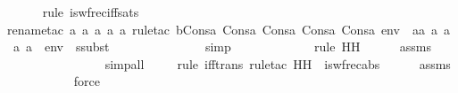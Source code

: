 \begin{isabellebody}
\ \ \ \ \ \isamarkupfalse%
{\isacharparenleft}{\kern0pt}rule\ is{\isacharunderscore}{\kern0pt}wfrec{\isacharunderscore}{\kern0pt}iff{\isacharunderscore}{\kern0pt}sats{\isacharparenright}{\kern0pt}\isanewline
\ \ \ \ \ \ \ \ \ \ \ \ \isamarkupfalse%
{\isacharparenleft}{\kern0pt}rename{\isacharunderscore}{\kern0pt}tac\ a{}\ a{}\ a{}\ a{}\ a{}{\isacharcomma}{\kern0pt}\ rule{\isacharunderscore}{\kern0pt}tac\ b{\isacharequal}{\kern0pt}{\isachardoublequoteopen}Cons{\isacharparenleft}{\kern0pt}a{}{\isacharcomma}{\kern0pt}\ Cons{\isacharparenleft}{\kern0pt}a{}{\isacharcomma}{\kern0pt}\ Cons{\isacharparenleft}{\kern0pt}a{}{\isacharcomma}{\kern0pt}\ Cons{\isacharparenleft}{\kern0pt}a{}{\isacharcomma}{\kern0pt}\ Cons{\isacharparenleft}{\kern0pt}a{}{\isacharcomma}{\kern0pt}\ env{\isacharparenright}{\kern0pt}{\isacharparenright}{\kern0pt}{\isacharparenright}{\kern0pt}{\isacharparenright}{\kern0pt}{\isacharparenright}{\kern0pt}{\isachardoublequoteclose}\ \ a{\isacharequal}{\kern0pt}{\isachardoublequoteopen}{\isacharbrackleft}{\kern0pt}a{}{\isacharcomma}{\kern0pt}\ a{}{\isacharcomma}{\kern0pt}\ a{}{\isacharbrackright}{\kern0pt}\ {\isacharat}{\kern0pt}\ {\isacharparenleft}{\kern0pt}{\isacharbrackleft}{\kern0pt}a{}{\isacharcomma}{\kern0pt}\ a{}{\isacharbrackright}{\kern0pt}\ {\isacharat}{\kern0pt}\ env{\isacharparenright}{\kern0pt}{\isachardoublequoteclose}\ \ ssubst{\isacharparenright}{\kern0pt}\isanewline
\ \ \ \ \ \ \ \ \ \ \ \ \ \isamarkupfalse%
\ simp\isanewline
\ \ \ \ \ \ \ \ \ \ \ \ \isamarkupfalse%
{\isacharparenleft}{\kern0pt}rule\ HH{\isacharparenright}{\kern0pt}\isanewline
\ \ \ \ \isamarkupfalse%
\ assms\isanewline
\ \ \ \ \ \ \ \ \ \ \ \ \ \ \ \isamarkupfalse%
{\isacharparenleft}{\kern0pt}simp{\isacharunderscore}{\kern0pt}all{\isacharparenright}{\kern0pt}\isanewline
\ \ \ \ \isamarkupfalse%
{\isacharparenleft}{\kern0pt}rule\ iff{\isacharunderscore}{\kern0pt}trans{\isacharcomma}{\kern0pt}\ rule{\isacharunderscore}{\kern0pt}tac\ H{\isacharequal}{\kern0pt}H\ \ is{\isacharunderscore}{\kern0pt}wfrec{\isacharunderscore}{\kern0pt}abs{\isacharparenright}{\kern0pt}\isanewline
\ \ \ \ \isamarkupfalse%
\ assms\ \isanewline
\ \ \ \ \ \ \ \ \ \isamarkupfalse%
\ force\isanewline
\ \ \ \ \isamarkupfalse%

\end{isabellebody}
